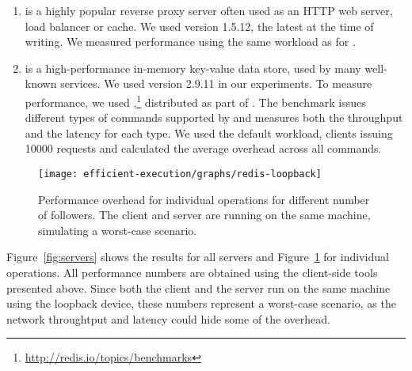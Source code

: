 \begin{enumerate}
\item[\nginx\footnote{\url{http://nginx.org/}}]
is a highly popular reverse proxy server often used as an HTTP web
server, load balancer or cache. We used version 1.5.12, the
latest at the time of writing.  We measured
performance using the same workload as for \lighttpdtwo.


\item[\redis\footnote{\url{http://redis.io/}}]
is a high-performance in-memory key-value data store, used by many
well-known services. %
We used version 2.9.11 in our experiments.  To measure performance, we used
\redisbenchmark,\footnote{\url{http://redis.io/topics/benchmarks}} distributed
as part of \redis. The benchmark issues different types of commands supported
by \redis and measures both the throughput and the latency for each type. We
used the default workload,  clients issuing \num{10000} requests and
calculated the average overhead across all commands.

\end{enumerate}

\begin{figure}[!t]
 \centering
 \texttt{[image: efficient-execution/graphs/redis-loopback]}
 \caption{Performance overhead for individual \redis operations for different
 number of followers. The client and server are running on the same machine,
 simulating a worst-case scenario.}
 \label{fig:redis-ops}
\end{figure}

Figure~\ref{fig:servers} shows the results for all servers and
Figure~\ref{fig:redis-ops} for individual \redis operations. All performance
numbers are obtained using the client-side tools presented above.  Since both
the client and the server run on the same machine using the loopback device,
these numbers represent a worst-case scenario, as the network throughtput and
latency could hide some of the overhead.


